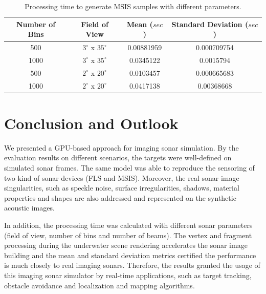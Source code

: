 \documentclass[final,5p,times]{elsarticle}
\begin{document}
\begin{table}
    \caption{Processing time to generate MSIS samples with different parameters.}
    \label{table:msis}
    \begin{center}
        \begin{tabular}{| c | c | c | c |}
            \hline
            Number of Bins & Field of View & Mean ($sec$) & Standard Deviation ($sec$) \\
            \hline
            500       & $3^{\circ}$ x $35^{\circ}$        & 0.00881959	& 0.000709754  \\ \hline
            1000      & $3^{\circ}$ x $35^{\circ}$        & 0.0345122	& 0.0015794    \\ \hline
            500       & $2^{\circ}$ x $20^{\circ}$        & 0.0103457	& 0.000665683  \\ \hline
            1000      & $2^{\circ}$ x $20^{\circ}$        & 0.0417138	& 0.00368668   \\ \hline
        \end{tabular}
    \end{center}
\end{table}


\section{Conclusion and Outlook}
\label{conclusion}

We presented a GPU-based approach for imaging sonar simulation. By the evaluation results on different scenarios, the targets were well-defined on simulated sonar frames. The same model was able to reproduce the sensoring of two kind of sonar devices (FLS and MSIS). Moreover, the real sonar image singularities, such as speckle noise, surface irregularities, shadows, material properties and shapes are also addressed and represented on the synthetic acoustic images.

In addition, the processing time was calculated with different sonar parameters (field of view, number of bins and number of beams). The vertex and fragment processing during the underwater scene rendering accelerates the sonar image building and the mean and standard deviation metrics certified the performance is much closely to real imaging sonars. Therefore, the results granted the usage of this imaging sonar simulator by real-time applications, such as target tracking, obstacle avoidance and localization and mapping algorithms.
\end{document}
